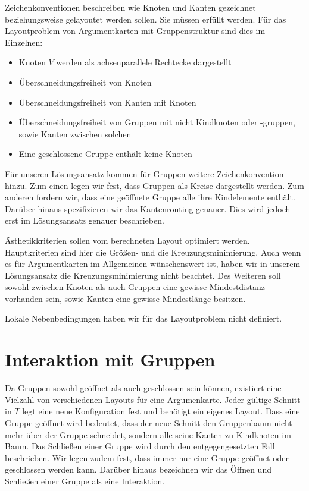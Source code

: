 Zeichenkonventionen beschreiben wie Knoten und Kanten gezeichnet beziehungsweise gelayoutet werden sollen. Sie müssen erfüllt werden.
Für das Layoutproblem von Argumentkarten mit Gruppenstruktur sind dies im Einzelnen:
\begin{itemize}
\item Knoten $V$ werden als achsenparallele Rechtecke dargestellt
\item Überschneidungsfreiheit von Knoten
\item Überschneidungsfreiheit von Kanten mit Knoten
\item Überschneidungsfreiheit von Gruppen mit nicht Kindknoten oder -gruppen, sowie Kanten zwischen solchen
\item Eine geschlossene Gruppe enthält keine Knoten
\end{itemize}

Für unseren Lösungsansatz kommen für Gruppen weitere Zeichenkonvention hinzu. Zum einen legen wir fest, dass Gruppen
als Kreise dargestellt werden. Zum anderen fordern wir, dass eine geöffnete Gruppe alle ihre Kindelemente enthält. 
Darüber hinaus spezifizieren wir das Kantenrouting genauer. Dies wird jedoch erst im Lösungsansatz genauer beschrieben.

Ästhetikkriterien sollen vom berechneten Layout optimiert werden. Hauptkriterien sind hier die Größen- und die Kreuzungsminimierung.
Auch wenn es für Argumentkarten im Allgemeinen wünschenswert ist, haben wir in unserem Lösungsansatz die Kreuzungsminimierung nicht beachtet.
Des Weiteren soll sowohl zwischen Knoten als auch Gruppen eine gewisse Mindestdistanz vorhanden sein, sowie Kanten eine gewisse Mindestlänge besitzen.

Lokale Nebenbedingungen haben wir für das Layoutproblem nicht definiert.


\section{Interaktion mit Gruppen}
Da Gruppen sowohl geöffnet als auch geschlossen sein können, existiert eine Vielzahl von verschiedenen Layouts für eine Argumenkarte.
Jeder gültige Schnitt in $T$ legt eine neue Konfiguration fest und benötigt ein eigenes Layout. 
Dass eine Gruppe geöffnet wird bedeutet, dass der neue Schnitt den Gruppenbaum nicht mehr über der Gruppe schneidet, sondern alle seine Kanten zu Kindknoten im Baum.
Das Schließen einer Gruppe wird durch den entgegengesetzten Fall beschrieben. Wir legen zudem fest, dass immer nur eine Gruppe geöffnet oder geschlossen werden kann. Darüber hinaus bezeichnen wir das Öffnen und Schließen einer Gruppe als eine Interaktion.

